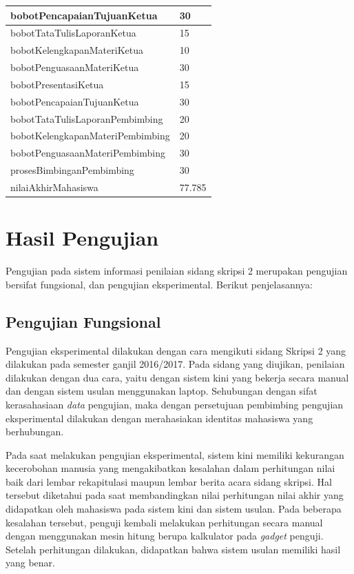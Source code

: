 \begin{itemize}
\begin{table}[htbp]
\begin{tabular}{| m{7cm} | m{5cm} |}
				\hline
				bobotPencapaianTujuanKetua & 30\\
				\hline
				bobotTataTulisLaporanKetua & 15\\
				\hline
				bobotKelengkapanMateriKetua & 10\\
				\hline
				bobotPenguasaanMateriKetua & 30\\
				\hline
				bobotPresentasiKetua & 15\\
				\hline
				bobotPencapaianTujuanKetua & 30\\
				\hline
				bobotTataTulisLaporanPembimbing & 20\\
				\hline
				bobotKelengkapanMateriPembimbing &20\\
				\hline
				bobotPenguasaanMateriPembimbing & 30\\
				\hline
				prosesBimbinganPembimbing & 30\\
				\hline
				nilaiAkhirMahasiswa & 77.785\\
				\hline
			\end{tabular}
		\end{table}
	\end{itemize}
	
\section{Hasil Pengujian}
\label{sec:hasilUji}

	Pengujian pada sistem informasi penilaian sidang skripsi 2 merupakan pengujian bersifat fungsional, dan pengujian eksperimental. Berikut penjelasannya:
	
	\subsection{Pengujian Fungsional}
	\label{sub: PFungsional}
	
	Pengujian eksperimental dilakukan dengan cara mengikuti sidang Skripsi 2 yang dilakukan pada semester ganjil 2016/2017. Pada sidang yang diujikan, penilaian dilakukan dengan dua cara, yaitu dengan sistem kini yang bekerja secara manual dan dengan sistem usulan menggunakan laptop. Sehubungan dengan sifat kerasahasiaan \textit{data} pengujian, maka dengan persetujuan pembimbing pengujian eksperimental dilakukan dengan merahasiakan identitas mahasiswa yang berhubungan.
	
	Pada saat melakukan pengujian eksperimental, sistem kini memiliki kekurangan kecerobohan manusia yang mengakibatkan kesalahan dalam perhitungan nilai baik dari lembar rekapitulasi maupun lembar berita acara sidang skripsi. Hal tersebut diketahui pada saat membandingkan nilai perhitungan nilai akhir yang didapatkan oleh mahasiswa pada sistem kini dan sistem usulan. Pada beberapa kesalahan tersebut, penguji kembali melakukan perhitungan secara manual dengan menggunakan mesin hitung berupa kalkulator pada \textit{gadget} penguji. Setelah perhitungan dilakukan, didapatkan bahwa sistem usulan memiliki hasil yang benar.
	
